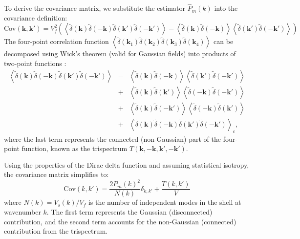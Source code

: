 To derive the covariance matrix, we substitute the estimator \( \hat{P}_m(k) \) into the covariance definition:
\begin{equation}
    \mathrm{Cov}(\mathbf{k}, \mathbf{k'}) = V_f^2 \left( \left\langle \tilde{\delta}(\mathbf{k}) \tilde{\delta}(-\mathbf{k}) \tilde{\delta}(\mathbf{k'}) \tilde{\delta}(-\mathbf{k'}) \right\rangle - \left\langle \tilde{\delta}(\mathbf{k}) \tilde{\delta}(-\mathbf{k}) \right\rangle \left\langle \tilde{\delta}(\mathbf{k'}) \tilde{\delta}(-\mathbf{k'}) \right\rangle\right)
\end{equation}
The four-point correlation function \( \left\langle \tilde{\delta}(\mathbf{k}_1) \tilde{\delta}(\mathbf{k}_2) \tilde{\delta}(\mathbf{k}_3) \tilde{\delta}(\mathbf{k}_4) \right\rangle \) can be decomposed using Wick's theorem (valid for Gaussian fields) into products of two-point functions \citep{PhysRev.80.268}:
\begin{eqnarray}
    \left\langle \tilde{\delta}(\mathbf{k}) \tilde{\delta}(-\mathbf{k}) \tilde{\delta}(\mathbf{k'}) \tilde{\delta}(-\mathbf{k'}) \right\rangle 
    &=& \left\langle \tilde{\delta}(\mathbf{k}) \tilde{\delta}(-\mathbf{k}) \right\rangle \left\langle \tilde{\delta}(\mathbf{k'}) \tilde{\delta}(-\mathbf{k'}) \right\rangle \nonumber \\
    &+& \left\langle \tilde{\delta}(\mathbf{k}) \tilde{\delta}(\mathbf{k'}) \right\rangle \left\langle \tilde{\delta}(-\mathbf{k}) \tilde{\delta}(-\mathbf{k'}) \right\rangle \nonumber \\
    &+& \left\langle \tilde{\delta}(\mathbf{k}) \tilde{\delta}(-\mathbf{k'}) \right\rangle \left\langle \tilde{\delta}(-\mathbf{k}) \tilde{\delta}(\mathbf{k'}) \right\rangle \nonumber \\ 
    &+& \left\langle \tilde{\delta}(\mathbf{k}) \tilde{\delta}(-\mathbf{k}) \tilde{\delta}(\mathbf{k'}) \tilde{\delta}(-\mathbf{k'}) \right\rangle_c,
\end{eqnarray}
where the last term represents the connected (non-Gaussian) part of the four-point function, known as the trispectrum \( T(\mathbf{k}, -\mathbf{k}, \mathbf{k}', -\mathbf{k}') \).

Using the properties of the Dirac delta function and assuming statistical isotropy, the covariance matrix simplifies to:
\begin{equation}
    \mathrm{Cov}(k, k') = \frac{2 P_m(k)^2}{N(k)} \delta_{k,k'} + \frac{T(k, k')}{V}
\end{equation}
where \( N(k) = V_s(k) / V_f \) is the number of independent modes in the shell at wavenumber \( k \). The first term represents the Gaussian (disconnected) contribution, and the second term accounts for the non-Gaussian (connected) contribution from the trispectrum.

